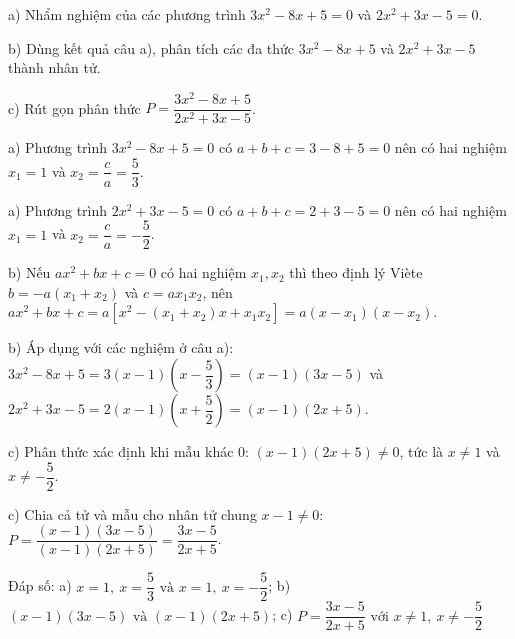 \begin{problem}[9DS-PT2-025]
a) Nhẩm nghiệm của các phương trình $3x^2 - 8x + 5 = 0$ và $2x^2 + 3x - 5 = 0$.

b) Dùng kết quả câu a), phân tích các đa thức $3x^2 - 8x + 5$ và $2x^2 + 3x - 5$ thành nhân tử.

c) Rút gọn phân thức $P = \dfrac{3x^2 - 8x + 5}{2x^2 + 3x - 5}$.

\begin{solution}
a) Phương trình $3x^2 - 8x + 5 = 0$ có $a + b + c = 3 - 8 + 5 = 0$ nên có hai nghiệm $x_1 = 1$ và $x_2 = \dfrac{c}{a} = \dfrac{5}{3}$.

a) Phương trình $2x^2 + 3x - 5 = 0$ có $a + b + c = 2 + 3 - 5 = 0$ nên có hai nghiệm $x_1 = 1$ và $x_2 = \dfrac{c}{a} = -\dfrac{5}{2}$.

b) Nếu $ax^2 + bx + c = 0$ có hai nghiệm $x_1, x_2$ thì theo định lý Viète $b = -a(x_1 + x_2)$ và $c = ax_1x_2$, nên $ax^2 + bx + c = a[x^2 - (x_1 + x_2)x + x_1x_2] = a(x - x_1)(x - x_2)$.

b) Áp dụng với các nghiệm ở câu a): $3x^2 - 8x + 5 = 3(x - 1)\left(x - \dfrac{5}{3}\right) = (x - 1)(3x - 5)$ và $2x^2 + 3x - 5 = 2(x - 1)\left(x + \dfrac{5}{2}\right) = (x - 1)(2x + 5)$.

c) Phân thức xác định khi mẫu khác $0$: $(x - 1)(2x + 5) \neq 0$, tức là $x \neq 1$ và $x \neq -\dfrac{5}{2}$.

c) Chia cả tử và mẫu cho nhân tử chung $x - 1 \neq 0$: $P = \dfrac{(x - 1)(3x - 5)}{(x - 1)(2x + 5)} = \dfrac{3x - 5}{2x + 5}$.

Đáp số: a) $\boxed{x = 1,\ x = \dfrac{5}{3} \text{ và } x = 1,\ x = -\dfrac{5}{2}}$; b) $\boxed{(x - 1)(3x - 5) \text{ và } (x - 1)(2x + 5)}$; c) $\boxed{P = \dfrac{3x - 5}{2x + 5} \text{ với } x \neq 1,\ x \neq -\dfrac{5}{2}}$
\end{solution}
\end{problem}

